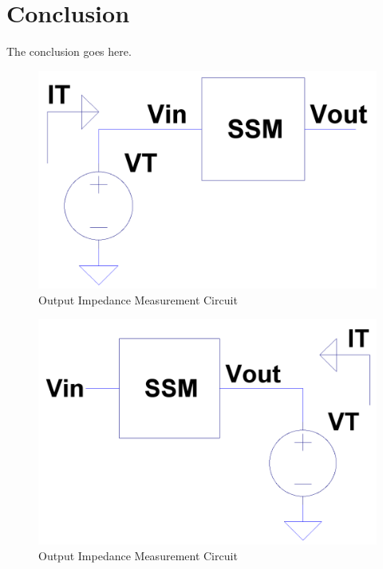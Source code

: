 \documentclass[conference]{IEEEtran}
\begin{document}
\section{Conclusion}
The conclusion goes here.

\appendix
\label{app:A}
\begin{figure}[!htbp]
  	\centering
  	\includegraphics[scale=0.15]{images/input-z-meas.png}
  	\caption[input-z-meas]{Output Impedance Measurement Circuit}
  	\label{fig:input-z-meas}
	\end{figure}

\begin{figure}[!htbp]
  	\centering
  	\includegraphics[scale=0.15]{images/output-z-meas.png}
  	\caption[output-z-meas]{Output Impedance Measurement Circuit}
  	\label{fig:output-z-meas}
	\end{figure}
\end{document}
